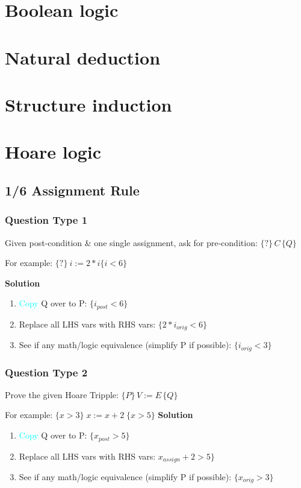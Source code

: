 \documentclass[10pt,landscape]{article}
\begin{document}
\begin{multicols*}{3}
\section{Boolean logic}

\section{Natural deduction}

\section{Structure induction}

\section{Hoare logic}
\subsection*{1/6 Assignment Rule}
\subsubsection*{Question Type 1}
Given post-condition \& one single assignment, ask for pre-condition:
\(\{?\}\,C\,\{Q\}\)

For example: \(\{?\}\ i := 2 * i \{i < 6\}\)

\textbf{Solution}
\begin{enumerate}
\item \textcolor{Cyan}{Copy} Q over to P: \(\{i_{post} < 6\}\)
\item Replace all LHS vars with RHS vars: \(\{2 * i_{orig} < 6\}\)
\item See if any math/logic equivalence (simplify P if possible): \(\{i_{orig} < 3\}\)
\end{enumerate}

\subsubsection*{Question Type 2}
Prove the given Hoare Tripple: \(\{P\}\,V := E\,\{Q\}\)

For example: \(\{x > 3\}\;x:=x+2\;\{x>5\}\)
\textbf{Solution}
\begin{enumerate}
\item \textcolor{Cyan}{Copy} Q over to P: \(\{x_{post} > 5\}\)
\item Replace all LHS vars with RHS vars: \(x_{assign}+2 > 5\}\)
\item See if any math/logic equivalence (simplify P if possible): \(\{x_{orig} > 3\}\)
\end{enumerate}




\end{multicols*}
\end{document}

